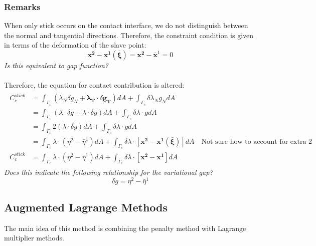 \documentclass[12pt,3p]{article}
\numberwithin{equation}{section}
\begin{document}
\subsubsection{Remarks}
When only stick occurs on the contact interface, we do not distinguish between the normal and tangential directions. Therefore, the constraint condition is given in terms of the deformation of the slave point:
\begin{equation}\label{629}
\mathbf{x^2} - \mathbf{x^1} (\bar{\mathbf{\xi}}) = \mathbf{x^2} - \mathbf{\bar{x}}^1 = 0 
\end{equation}
\textit{Is this equivalent to gap function?} \\ \\
Therefore, the equation for contact contribution is altered:
\begin{align}\label{630}
\begin{split}
C_c^{stick} &= \int_{\Gamma_c} (\lambda_N \delta g_N + \mathbf{\lambda_T} \cdot \delta \mathbf{g_T}) dA + \int_{\Gamma_c} \delta \lambda_N g_N dA \\
		&= \int_{\Gamma_c} (\lambda \cdot \delta g + \lambda \cdot \delta g) dA + \int_{\Gamma_c} \delta \lambda \cdot g dA \\
		&= \int_{\Gamma_c} 2 ( \lambda \cdot \delta g) dA + \int_{\Gamma_c} \delta \lambda \cdot g dA \\
		&= \int_{\Gamma_c} \lambda \cdot (\eta^2 - \bar{\eta}^1) dA + \int_{\Gamma_c} \delta \lambda \cdot [ \mathbf{x^2} - \mathbf{x^1} (\bar{\mathbf{\xi}}) ] dA \quad \text{Not sure how to account for extra 2}\\
C_c^{stick} &= \int_{\Gamma_c} \lambda \cdot (\eta^2 - \bar{\eta}^1) dA + \int_{\Gamma_c} \delta \lambda \cdot [ \mathbf{x^2} - \mathbf{x^1} ] dA 
\end{split}
\end{align}
\textit{Does this indicate the following relationship for the variational gap?}
\begin{equation}\label{varGap}
\delta g = \eta^2 - \bar{\eta}^1
\end{equation}

\subsection{Augmented Lagrange Methods}
The main idea of this method is combining the penalty method with Lagrange multiplier methods. 
\end{document}
